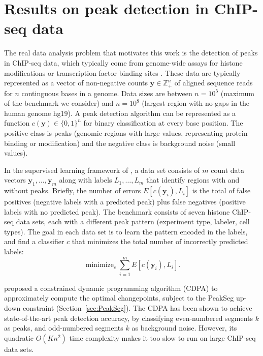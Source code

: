 \documentclass{article}
\DeclareMathOperator*{\minimize}{minimize}
\newcommand{\ZZ}{\mathbb Z}
\begin{document}
\section{Results on peak detection in ChIP-seq data}
\label{sec:results-chip-seq}
\label{sec:results}

The real data analysis problem that motivates this work is the
detection of peaks in ChIP-seq data, which typically come from
genome-wide assays for histone modifications or transcription factor
binding sites \citep{practical}. These data are typically represented
as a vector of non-negative counts $\mathbf y\in\ZZ_+^n$ of aligned
sequence reads for $n$ continguous bases in a genome. Data sizes are
between $n=10^5$ (maximum of the benchmark we consider) and $n=10^8$
(largest region with no gaps in the human genome hg19). A peak
detection algorithm can be represented as a function
$c(\mathbf y)\in\{0,1\}^n$ for binary classification at every base
position. The positive class is peaks (genomic regions with large
values, representing protein binding or modification) and the negative
class is background noise (small values).


In the supervised learning framework of \citet{HOCKING2016-chipseq}, a
data set consists of $m$ count data vectors
$\mathbf y_1,\dots,\mathbf y_m$ along with labels $L_1,\dots, L_m$
that identify regions with and without peaks. Briefly, the number of
errors $E[c(\mathbf y_i), L_i]$ is the total of false positives
(negative labels with a predicted peak) plus false negatives (positive
labels with no predicted peak). The benchmark consists of seven
histone ChIP-seq data sets, each with a different peak pattern
(experiment type, labeler, cell types). The goal in each data set is
to learn the pattern encoded in the labels, and find a classifier $c$
that minimizes the total number of incorrectly predicted labels:
\begin{equation}
  \label{eq:learn}
  \minimize_c
  \sum_{i=1}^m E\left[
    c(\mathbf y_i), L_i
  \right].
\end{equation}

\citet{HOCKING-PeakSeg} proposed a constrained dynamic programming
algorithm (CDPA) to approximately compute the optimal changepoints,
subject to the PeakSeg up-down constraint
(Section~\ref{sec:PeakSeg}). The CDPA has been shown to achieve
state-of-the-art peak detection accuracy, by classifying even-numbered
segments $k$ as peaks, and odd-numbered segments $k$ as background
noise. However, its quadratic $O(Kn^2)$ time complexity makes it too
slow to run on large ChIP-seq data sets.
\end{document}
